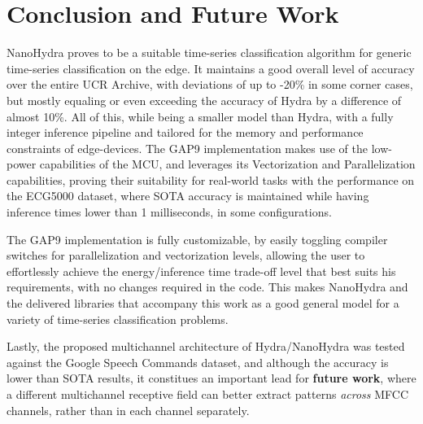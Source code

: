 \chapter{Conclusion and Future Work}
\label{ch:conclusion}


NanoHydra proves to be a suitable time-series classification algorithm for generic time-series classification on the edge. It maintains a good overall level of accuracy
over the entire UCR Archive, with deviations of up to -20\% in some corner cases, but mostly equaling or even exceeding the accuracy of Hydra by a difference of almost 10\%. All of this, 
while being a smaller model than Hydra, with a fully integer inference pipeline and tailored for the memory and performance constraints of edge-devices. The GAP9 implementation
makes use of the low-power capabilities of the MCU, and leverages its Vectorization and Parallelization capabilities, proving their suitability for real-world tasks with the 
performance on the ECG5000 dataset, where SOTA accuracy is maintained while having inference times lower than 1 milliseconds, in some configurations. 

The GAP9 implementation is fully customizable, by easily toggling compiler switches for parallelization and vectorization levels, allowing the user to effortlessly achieve the energy/inference time trade-off level
that best suits his requirements, with no changes required in the code. This makes NanoHydra and the delivered libraries that accompany this work as a good general model for a variety of time-series classification
problems.

Lastly, the proposed multichannel architecture of Hydra/NanoHydra was tested against the Google Speech Commands dataset, and although the accuracy is lower than SOTA results, it constitues
an important lead for \textbf{future work}, where a different multichannel receptive field can better extract patterns \emph{across} MFCC channels, rather than in each channel separately.
